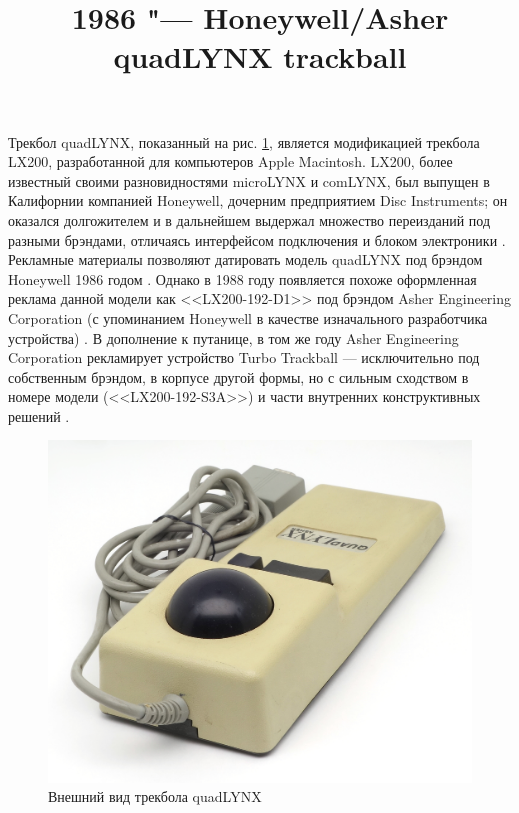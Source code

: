 \documentclass[11pt, a4paper]{article}
\begin{document}
\title{1986 "--- Honeywell/Asher quadLYNX trackball}
\date{}
\maketitle
{}
Трекбол quadLYNX, показанный на рис. \ref{fig:quadLYNXPic}, является модификацией трекбола LX200, разработанной для компьютеров Apple Macintosh. LX200, более известный своими разновидностями microLYNX и comLYNX, был выпущен в Калифорнии компанией Honeywell, дочерним предприятием Disc Instruments; он оказался долгожителем и в дальнейшем выдержал множество переизданий под разными брэндами, отличаясь интерфейсом подключения и блоком электроники \cite{lx200}. Рекламные материалы позволяют датировать модель quadLYNX под брэндом Honeywell 1986 годом \cite{honeywell}. Однако в 1988 году появляется похоже оформленная реклама данной модели как <<LX200-192-D1>> под брэндом Asher Engineering Corporation (с упоминанием Honeywell в качестве изначального разработчика устройства) \cite{asher}. В дополнение к путанице, в том же году Asher Engineering Corporation рекламирует устройство Turbo Trackball --- исключительно под собственным брэндом, в корпусе другой формы, но с сильным сходством в номере модели (<<LX200-192-S3A>>) и части внутренних конструктивных решений \cite{turbo}.

\begin{figure}[h]
    \centering
    \includegraphics[scale=0.75]{1986_honeywell_asher_quadlynx_trackball/pic_30.jpg}
    \caption{Внешний вид трекбола quadLYNX}
    \label{fig:quadLYNXPic}
\end{figure}
\end{document}
